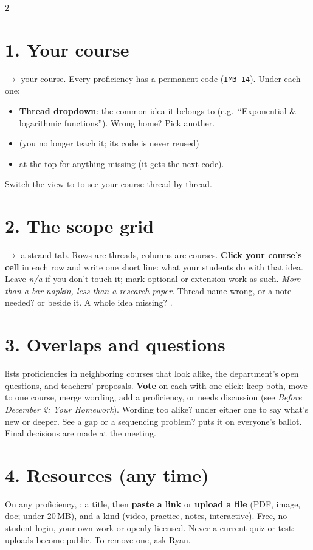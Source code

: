 \documentclass[10pt]{article}
\begin{document}
\begin{multicols}{2}
\section*{1. Your course}
 $\to$ your course. Every proficiency has a permanent code (\texttt{IM3-14}). Under each one:
\begin{itemize}
\item \textbf{Thread dropdown}: the common idea it belongs to (e.g.\ ``Exponential \& logarithmic
  functions''). Wrong home? Pick another.
\item {} \quad {} (you no longer teach it; its code is never reused)
\item {} at the top for anything missing (it gets the next code).
\end{itemize}
Switch the view to  to see your course thread by thread.

\section*{2. The scope grid}
 $\to$ a strand tab. Rows are threads, columns are courses.
\textbf{Click your course's cell} in each row and write one short line: what your students do with that
idea. Leave \emph{n/a} if you don't touch it; mark optional or extension work as such.
\textit{More than a bar napkin, less than a research paper.}
Thread name wrong, or a note needed?  or  beside it. A whole idea missing?
.

\section*{3. Overlaps and questions}
 lists proficiencies in neighboring courses that look alike, the department's open questions,
and teachers' proposals. \textbf{Vote} on each with one click: keep both, move to one course, merge
wording, add a proficiency, or needs discussion (see \emph{Before December 2: Your Homework}).
Wording too alike?  under either one to say what's new or deeper. See a gap or a
sequencing problem?  puts it on everyone's ballot. Final decisions are made at the meeting.

\columnbreak
\section*{4. Resources (any time)}
On any proficiency, : a title, then \textbf{paste a link} or \textbf{upload a file}
(PDF, image, doc; under 20\,MB), and a kind (video, practice, notes, interactive).
Free, no student login, your own work or openly licensed. Never a current quiz or test: uploads become
public. To remove one, ask Ryan.


\end{multicols}
\end{document}
